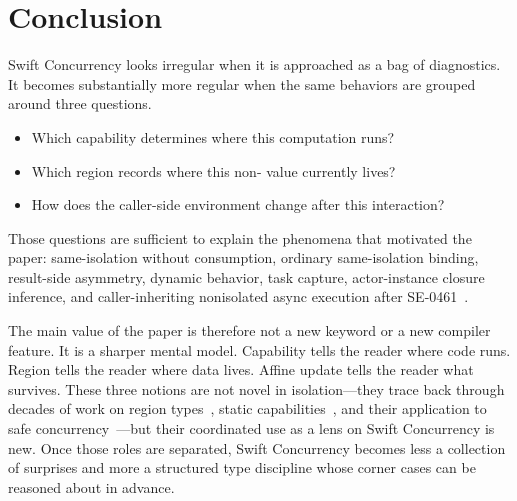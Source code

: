 \section{Conclusion}
\label{sec:conclusion}

Swift Concurrency looks irregular when it is approached as a bag of diagnostics. It becomes substantially more regular when the same behaviors are grouped around three questions.

\begin{itemize}
  \item Which capability determines where this computation runs?
  \item Which region records where this non- value currently lives?
  \item How does the caller-side environment change after this interaction?
\end{itemize}

Those questions are sufficient to explain the phenomena that motivated the paper: same-isolation  without consumption, ordinary same-isolation binding, result-side  asymmetry, dynamic  behavior, task capture, actor-instance closure inference, and caller-inheriting nonisolated async execution after SE-0461~\cite{se0461}.

The main value of the paper is therefore not a new keyword or a new compiler feature. It is a sharper mental model. Capability tells the reader where code runs. Region tells the reader where data lives. Affine update tells the reader what survives. These three notions are not novel in isolation—they trace back through decades of work on region types~\cite{tofte1997region}, static capabilities~\cite{walker2000capabilities}, and their application to safe concurrency~\cite{milano2022fearless}—but their coordinated use as a lens on Swift Concurrency is new. Once those roles are separated, Swift Concurrency becomes less a collection of surprises and more a structured type discipline whose corner cases can be reasoned about in advance.
